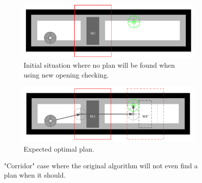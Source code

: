 \begin{figure}[H]
\centering
\begin{subfigure}{.48\textwidth}
  \centering
  \includegraphics[width=\linewidth]{Figures/Check_New_Opening/corridor_original.png}
  \caption{Initial situation where no plan will be found when using new opening checking.}
  \label{fig:corridor_original}
\end{subfigure}\hspace*{\fill}
\begin{subfigure}{.48\textwidth}
  \centering
  \includegraphics[width=\linewidth]{Figures/Check_New_Opening/corridor_optimal_path.png}
  \caption{Expected optimal plan.}
  \label{fig:corridor_optimal_path}
\end{subfigure}
\caption{"Corridor" case where the original algorithm will not even find a plan when it should.}
\label{fig:corridor_case}
\end{figure}

